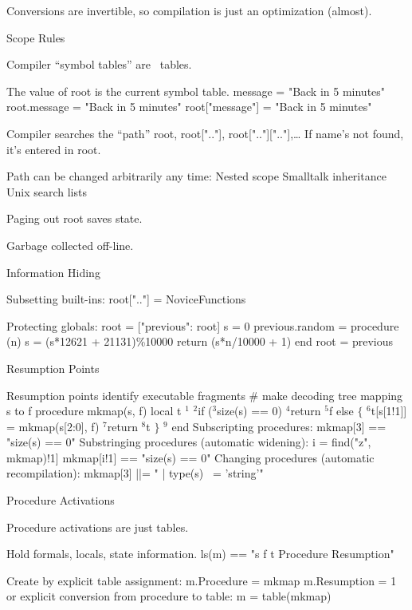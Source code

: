 \Bullet Conversions are invertible,
	so compilation is just an optimization (almost).

\NewPage
\centerline{\bigrm Scope Rules}
\Bullet Compiler ``symbol tables'' are \EZ\ tables.

\Bullet The value of {\pt root} is the current symbol table.
\program
		message = "Back in 5 minutes"
		root.message = "Back in 5 minutes"
		root["message"] = "Back in 5 minutes"
\endprogram

\Bullet Compiler searches the ``path''
		 {\pt root, root[".."], root[".."][".."],}\dots
		 If name's not found, it's entered in {\pt root}.

\Bullet Path can be changed arbitrarily any time:
		Nested scope
		Smalltalk inheritance
		Unix search lists

\Bullet Paging out {\pt root} saves state.

\Bullet Garbage collected off-line.

\NewPage
\centerline{\bigrm Information Hiding}
\Bullet Subsetting built-ins:
\program
		root[".."] = NoviceFunctions
\endprogram

\Bullet Protecting globals:
\program
		root = ["previous": root]
\medskip
		s = 0
		previous.random = procedure (n)
			s = (s*12621 + 21131)\%10000
			return (s*n/10000 + 1)
		end
\medskip
		root = previous
\endprogram

\NewPage
\centerline{\bigrm Resumption Points}
\Bullet Resumption points identify executable fragments
\program
		\# make decoding tree mapping s to f
		procedure mkmap(s, f) local t
			$^1$
			$^2$if ($^3$size(s) == 0)
				$^4$return $^5$f
			else $\{$
				$^6$t[s[1!1]] = mkmap(s[2:0], f)
				$^7$return $^8$t
				$\}$
			$^9$
		end
\endprogram
\Bullet Subscripting procedures:
		{\pt mkmap[3] == "size(s) == 0"}
\Bullet Substringing procedures (automatic widening):
		{\pt i = find("z", mkmap)!1]
		mkmap[i!1] == "size(s) == 0"}
\Bullet Changing procedures (automatic recompilation):
\program
		mkmap[3] ||= " | type(s) ~= 'string'"
\endprogram

\NewPage
\centerline{\bigrm Procedure Activations}

\Bullet Procedure activations are just tables.

\Bullet Hold formals, locals, state information.
		{\pt ls(m) == "s f t Procedure Resumption"}

\Bullet Create by explicit table assignment:
		{\pt m.Procedure = mkmap
		m.Resumption = 1}
	or explicit conversion from procedure to table:
		{\pt m = table(mkmap)}

